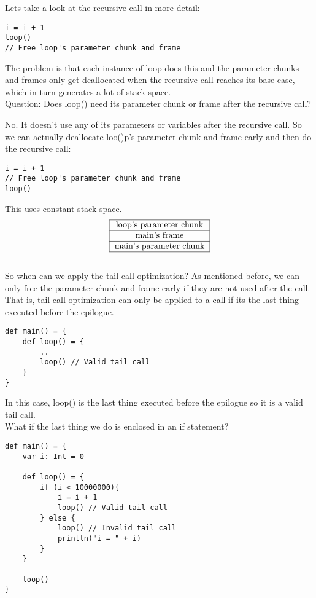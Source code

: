 \documentclass[12pt, letterpaper]{article}
\begin{document}
Lets take a look at the recursive call in more detail:
\begin{lstlisting}
i = i + 1
loop()
// Free loop's parameter chunk and frame
\end{lstlisting}

The problem is that each instance of loop does this and the parameter chunks and frames only get deallocated when the recursive call reaches its base case, which in turn generates a lot of stack space.\\

Question: Does loop() need its parameter chunk or frame after the recursive call?

No. It doesn't use any of its parameters or variables after the recursive call. So we can actually deallocate loo()p's parameter chunk and frame early and then do the recursive call:
\begin{lstlisting}
i = i + 1
// Free loop's parameter chunk and frame
loop()
\end{lstlisting}
This uses constant stack space.\\

\[
\begin{tabular}{|c|}
\hline
loop's parameter chunk\\
\hline
main's frame\\
\hline
main's parameter chunk\\
\hline
\end{tabular}
\]\\

So when can we apply the tail call optimization? As mentioned before, we can only free the parameter chunk and frame early if they are not used after the call. That is, tail call optimization can only be applied to a call if its the last thing executed before the epilogue.
\begin{lstlisting}
def main() = {
	def loop() = {
		..
		loop() // Valid tail call
	}
}
\end{lstlisting}
In this case, loop() is the last thing executed before the epilogue so it is a valid tail call.\\

What if the last thing we do is enclosed in an if statement?
\begin{lstlisting}
def main() = {
	var i: Int = 0
	
	def loop() = {
		if (i < 10000000){
			i = i + 1
			loop() // Valid tail call
		} else {
			loop() // Invalid tail call
			println("i = " + i)
		}
	}
	
	loop()
}
\end{lstlisting}
\end{document}
